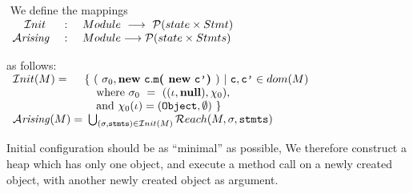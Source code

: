 \begin{definition} $ $ We define the mappings \\
$\begin{array}{lcl}
{\ensuremath{ ~ }} {\hspace{.1in}} {\mathcal{I}nit} & \ : \ & {Module} \   \longrightarrow\  \mathcal{P}( {state} \times {Stmt}  )
\\
 {\mathcal{A}}\textrm{\textit{rising}} & : &  {Module}    \longrightarrow \mathcal{P}( {state} \times {Stmts}  )
\end{array}$

\noindent
as follows:\\
$\begin{array}{l@{\,}l}
 {\mathcal{I}nit}(\M)   =  &  \{ \ (\ \sigma_0, \kw{new}\ \clss{}.\prg{m}\lp\kw{new}\  \clss{'} \rp) \ |    \ \clss{},\clss{'}\in dom( \M) \\
    &  \SP  \mbox{where}\  \sigma_0\ =\ ( (\iota,\kw{null}),\chi_0), \\
    & \SP  \mbox{and}\   \chi_0(\iota)=(\prg{Object}, \emptyset)\  \}
 \\
 \Arising(\M)    =   & \    \bigcup_{ (\sigma,\code{})\in  \mathcal{I}nit (\M)}  \Reach(\M, \sigma, \code{})
\end{array}$
\end{definition}


\noindent
Initial configuration should be as ``minimal'' as possible, We therefore construct a heap which has only one object, and execute a method call on a newly created
object, with another newly created object as argument. 




